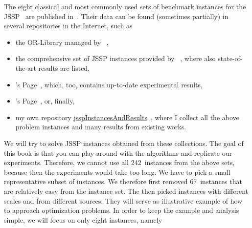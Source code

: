 The eight classical and most commonly used sets of benchmark instances for the JSSP~\cite{H2002PJSSP} are published in~\cite{FT1963PLCOLJSSR,ABZ1988TSBPFJSS,AC1991ACSOTJSSP,SWV1992NSSFSPWATJSS,YN1992AGAATLSJSI,L1998RCPSAEIOHSTS,DMU1998BFSSP,T1993BFBSP}.
Their data can be found (sometimes partially) in several repositories in the Internet, such as%
%
\begin{itemize}%
%
\item the OR-Library managed by ~\cite{B1990OLDTPBEM},%
%
\item the comprehensive set of JSSP instances provided by ~\cite{vH2015JSIAS,vH2018TCSOBOBIOTJSSP}, where also state-of-the-art results are listed,%
%
\item {}'s Page~\cite{S2019JSSPH}, which, too, contains up-to-date experimental results,%
%
\item {}'s Page~\cite{T1993SI}, or, finally,%
%
\item my own repository \href{http://github.com/thomasWeise/jsspInstancesAndResults}{jsspInstancesAndResults}~\cite{W2019JRDAIOTJSSP}, where I collect all the above problem instances and many results from existing works.%
%
\end{itemize}%
%
We will try to solve JSSP instances obtained from these collections.
The goal of this book is that you can play around with the algorithms and replicate our experiments.
Therefore, we cannot use all 242~instances from the above sets, because then the experiments would take too long.
We have to pick a small representative subset of instances.
We therefore first removed 67~instances that are relatively easy from the instance set.
The then picked instances with different scales and from different sources.
They will serve as illustrative example of how to approach optimization problems.
In order to keep the example and analysis simple, we will focus on only eight instances, namely%
%
